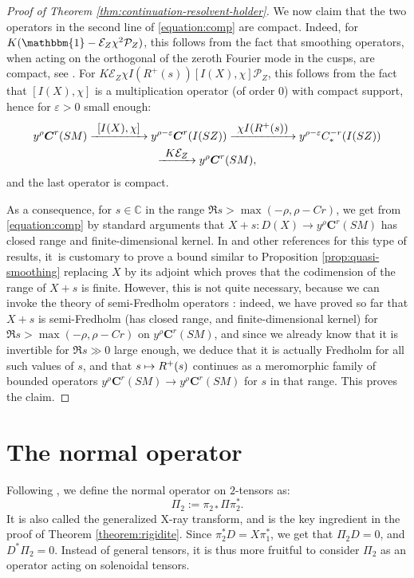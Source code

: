 \documentclass[10pt]{amsart}
\newcommand\mto{\mathchoice{\longmapsto}{\mapsto}{\mapsto}{\mapsto}}
\newcommand\To[1]{\mathchoice{\xrightarrow{\textstyle\kern4pt#1\kern3pt}}{\stackrel{#1}{\longrightarrow}}{}{}}
\newcommand{\bC}{\boldsymbol{C}}
\newcommand{\C}{\mathbb{C}}
\newcommand{\eps}{\varepsilon}
\newcommand{\mc}{\mathcal}
\newcommand{\ZZ}{I(SZ)}
\theoremstyle{plain}
\theoremstyle{definition}
\begin{document}
\begin{proof}[Proof of Theorem \ref{thm:continuation-resolvent-holder}]
We now claim that the two operators in the second line of \eqref{equation:comp} are compact. Indeed, for $K(\mathbbm{1}-\mathcal{E}_Z\chi^2\mathcal{P}_Z)$, this follows from the fact that smoothing operators, when acting on the orthogonal of the zeroth Fourier mode in the cusps, are compact, see \cite[Lem.\,4.1]{Bonthonneau-Lefeuvre-19-1}. For $K \mathcal{E}_Z\chi I(R^+(s)) [I(X), \chi] \mathcal{P}_Z$, this follows from the fact that $[I(X),\chi]$ is a multiplication operator (of order $0$) with compact support, hence for $\eps > 0$ small enough:
\begin{multline*}
y^\rho\bC^r(SM) \To{[I(X),\chi]} y^{\rho-\eps} \bC^r(\ZZ) \To{\chi I(R^+(s))} y^{\rho-\eps} C^{-r}_*(\ZZ)\\
\To{K \mc{E}_Z} y^{\rho}\bC^r(SM),
\end{multline*}
and the last operator is compact.

As a consequence, for $s \in \C$ in the range $\Re s > \max(-\rho,\rho-Cr)$, we get from \eqref{equation:comp} by standard arguments that $X+s : D(X) \to y^\rho \bC^r(SM)$ has closed range and finite-dimensional kernel. In \cite{Dyatlov-Zworski-16} and other references for this type of results, it~is customary to prove a bound similar to Proposition \ref{prop:quasi-smoothing} replacing $X$ by its adjoint which proves that the codimension of the range of $X+s$ is finite. However, this is not quite necessary, because we can invoke the theory of semi-Fredholm operators \cite[Th.\,5.17, p.\,235] {Kato-95}: indeed, we have proved so far that $X+s$ is semi-Fredholm (\ie has closed range, and finite-dimensional kernel) for $\Re s > \max(- \rho,\rho-Cr)$ on $y^\rho \bC^{r}(SM)$, and since we already know that it is invertible for $\Re s \gg 0$ large enough, we deduce that it is actually Fredholm for all such values of $s$, and that $s \mto R^+(s)$ continues as a meromorphic family of bounded operators $ y^\rho \bC^r(SM) \to y^\rho \bC^r(SM)$ for $s$ in that range.
This proves the claim.
\end{proof}

\section{The normal operator}

\label{section:pi2}

Following \cite{Guillarmou-17-1}, we define the normal operator on $2$-tensors as:
\begin{equation}\label{eq:def-Pi2}
\Pi_2 := \pi_{2\ast} \Pi \pi_2^\ast.
\end{equation}
It is also called the generalized X-ray transform, and is the key ingredient in the proof of Theorem \ref{theorem:rigidite}. Since $\pi_2^\ast D = X\pi_1^\ast$, we get that $\Pi_2 D = 0$, and $D^\ast \Pi_2 = 0$. Instead of general tensors, it is thus more fruitful to consider $\Pi_2$ as an operator acting on solenoidal tensors.
\end{document}
